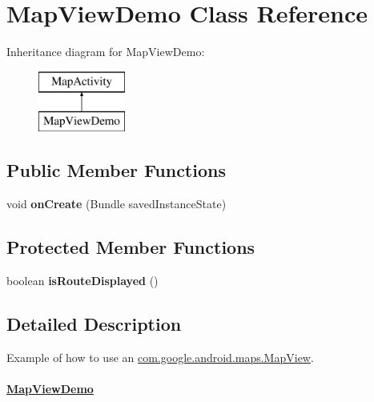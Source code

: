 \hypertarget{classcom_1_1example_1_1android_1_1apis_1_1view_1_1_map_view_demo}{\section{Map\-View\-Demo Class Reference}
\label{classcom_1_1example_1_1android_1_1apis_1_1view_1_1_map_view_demo}
}
Inheritance diagram for Map\-View\-Demo\-:\begin{figure}[H]
\begin{center}
\leavevmode
\includegraphics[height=2.000000cm]{classcom_1_1example_1_1android_1_1apis_1_1view_1_1_map_view_demo}
\end{center}
\end{figure}
\subsection*{Public Member Functions}
\begin{DoxyCompactItemize}
\item 
\hypertarget{classcom_1_1example_1_1android_1_1apis_1_1view_1_1_map_view_demo_a85e87cb5ced88dff7c8173ecc4f636d1}{void {\bfseries on\-Create} (Bundle saved\-Instance\-State)}\label{classcom_1_1example_1_1android_1_1apis_1_1view_1_1_map_view_demo_a85e87cb5ced88dff7c8173ecc4f636d1}

\end{DoxyCompactItemize}
\subsection*{Protected Member Functions}
\begin{DoxyCompactItemize}
\item 
\hypertarget{classcom_1_1example_1_1android_1_1apis_1_1view_1_1_map_view_demo_a294a4986d39cff22365b36850bb2a0ca}{boolean {\bfseries is\-Route\-Displayed} ()}\label{classcom_1_1example_1_1android_1_1apis_1_1view_1_1_map_view_demo_a294a4986d39cff22365b36850bb2a0ca}

\end{DoxyCompactItemize}


\subsection{Detailed Description}
Example of how to use an \hyperlink{}{com.\-google.\-android.\-maps.\-Map\-View}. \paragraph*{\hyperlink{classcom_1_1example_1_1android_1_1apis_1_1view_1_1_map_view_demo}{Map\-View\-Demo}}

